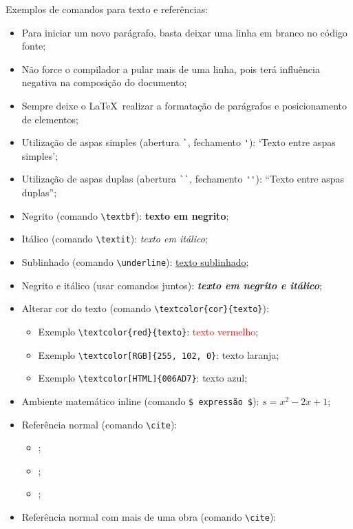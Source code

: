 Exemplos de comandos para texto e referências:

\begin{itemize}
	\item Para iniciar um novo parágrafo, basta deixar uma linha em branco no código fonte;
	\item Não force o compilador a pular mais de uma linha, pois terá influência negativa na composição do documento;
	\item Sempre deixe o \LaTeX\ realizar a formatação de parágrafos e posicionamento de elementos;
	\item Utilização de aspas simples (abertura \verb|`|, fechamento \verb|'|): `Texto entre aspas simples';
	\item Utilização de aspas duplas (abertura \verb|``|, fechamento \verb|''|): ``Texto entre aspas duplas'';
	\item Negrito (comando \verb|\textbf|): \textbf{texto em negrito};
	\item Itálico (comando \verb|\textit|): \textit{texto em itálico};
	\item Sublinhado (comando \verb|\underline|): \underline{texto sublinhado};
	\item Negrito e itálico (usar comandos juntos): \textbf{\textit{texto em negrito e itálico}};
	\item Alterar cor do texto (comando \verb|\textcolor{cor}{texto}|):
	\begin{itemize}
		\item Exemplo \verb|\textcolor{red}{texto}|: \textcolor{red}{texto vermelho};
		\item Exemplo \verb|\textcolor[RGB]{255, 102, 0}|: \textcolor[RGB]{255, 102, 0}{texto laranja};
		\item Exemplo \verb|\textcolor[HTML]{006AD7}|: \textcolor[HTML]{006AD7}{texto azul};
	\end{itemize}
	\item Ambiente matemático inline (comando \verb|$ expressão $|): $s = x^2-2x +1$;
	\item Referência normal (comando \verb|\cite|):
	\begin{itemize}
		\item \cite{Agaisse1995};
		\item \cite{Abedi2014};
		\item \cite{BtNomenclature2016};
	\end{itemize}
	\item Referência normal com mais de uma obra (comando \verb|\cite|):
	\begin{itemize}

\end{itemize}
\end{itemize}
